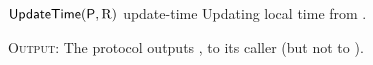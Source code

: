 \begin{cccProtocol}
    {$\textsf{UpdateTime}(\mathsf{P}, \mathrm{R})$}
    {update-time}
    {Updating local time from \funcImpClock.}

    \begin{algorithmic}[1]





        \EndIf

    \end{algorithmic}

    \textsc{Output}: The protocol outputs \localTime, \epoch to its caller (but not to \Z).
\end{cccProtocol}